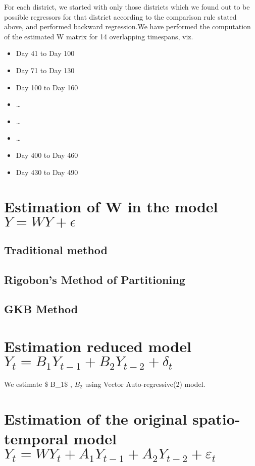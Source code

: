 \documentclass[
  12pt,
]{article}
\providecommand{\tightlist}{%
  \setlength{\itemsep}{0pt}\setlength{\parskip}{0pt}}
\begin{document}
For each district, we started with only those districts which we found
out to be possible regressors for that district according to the
comparison rule stated above, and performed backward regression.We have
performed the computation of the estimated W matrix for 14 overlapping
timespans, viz.~

\begin{itemize}
\tightlist
\item
  Day 41 to Day 100
\item
  Day 71 to Day 130
\item
  Day 100 to Day 160
\item
  \ldots{}
\item
  \ldots{}
\item
  \ldots{}
\item
  Day 400 to Day 460
\item
  Day 430 to Day 490
\end{itemize}

\section{\textbf{\textcolor{DeepBlue}{Estimation of W in the model $ Y=WY +\epsilon $}}}
\subsection{Traditional method}

\subsection{Rigobon's Method of Partitioning}

\subsection{GKB Method}

\section{\textbf{\textcolor{DeepBlue}{Estimation reduced model $Y_t = B_1 Y_{t-1} + B_2 Y_{t-2} + \delta_t$}}}

We estimate \$ B\_1\$ , \(B_2\) using Vector Auto-regressive(2) model.

\section{\textbf{\textcolor{DeepBlue}{Estimation of the original spatio-temporal model $ Y_t = WY_t + A_1 Y_{t-1} + A_2 Y_{t-2} + \varepsilon_t $}}}
\end{document}
